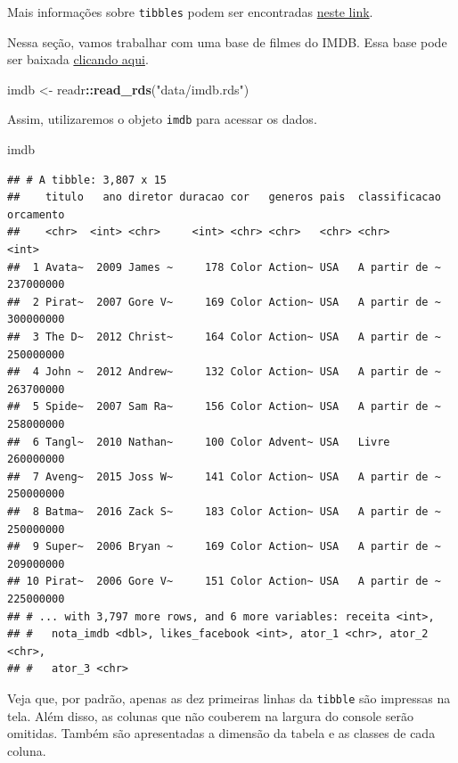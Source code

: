 \documentclass[
]{book}
\newenvironment{Shaded}{\begin{snugshade}}{\end{snugshade}}
\newcommand{\KeywordTok}[1]{\textcolor[rgb]{0.13,0.29,0.53}{\textbf{#1}}}
\newcommand{\NormalTok}[1]{#1}
\newcommand{\OperatorTok}[1]{\textcolor[rgb]{0.81,0.36,0.00}{\textbf{#1}}}
\newcommand{\StringTok}[1]{\textcolor[rgb]{0.31,0.60,0.02}{#1}}
\begin{document}
Mais informações sobre \texttt{tibbles} podem ser encontradas \href{http://r4ds.had.co.nz/tibbles.html}{neste link}.

Nessa seção, vamos trabalhar com uma base de filmes do IMDB. Essa base pode ser baixada \href{https://github.com/curso-r/site-v2/raw/master/content/material/importacao/data/imdb.rds}{clicando aqui}.

\begin{Shaded}
\begin{Highlighting}[]
\NormalTok{imdb <{-}}\StringTok{ }\NormalTok{readr}\OperatorTok{::}\KeywordTok{read\_rds}\NormalTok{(}\StringTok{"data/imdb.rds"}\NormalTok{)}
\end{Highlighting}
\end{Shaded}

Assim, utilizaremos o objeto \texttt{imdb} para acessar os dados.

\begin{Shaded}
\begin{Highlighting}[]
\NormalTok{imdb}
\end{Highlighting}
\end{Shaded}

\begin{verbatim}
## # A tibble: 3,807 x 15
##    titulo   ano diretor duracao cor   generos pais  classificacao orcamento
##    <chr>  <int> <chr>     <int> <chr> <chr>   <chr> <chr>             <int>
##  1 Avata~  2009 James ~     178 Color Action~ USA   A partir de ~ 237000000
##  2 Pirat~  2007 Gore V~     169 Color Action~ USA   A partir de ~ 300000000
##  3 The D~  2012 Christ~     164 Color Action~ USA   A partir de ~ 250000000
##  4 John ~  2012 Andrew~     132 Color Action~ USA   A partir de ~ 263700000
##  5 Spide~  2007 Sam Ra~     156 Color Action~ USA   A partir de ~ 258000000
##  6 Tangl~  2010 Nathan~     100 Color Advent~ USA   Livre         260000000
##  7 Aveng~  2015 Joss W~     141 Color Action~ USA   A partir de ~ 250000000
##  8 Batma~  2016 Zack S~     183 Color Action~ USA   A partir de ~ 250000000
##  9 Super~  2006 Bryan ~     169 Color Action~ USA   A partir de ~ 209000000
## 10 Pirat~  2006 Gore V~     151 Color Action~ USA   A partir de ~ 225000000
## # ... with 3,797 more rows, and 6 more variables: receita <int>,
## #   nota_imdb <dbl>, likes_facebook <int>, ator_1 <chr>, ator_2 <chr>,
## #   ator_3 <chr>
\end{verbatim}

Veja que, por padrão, apenas as dez primeiras linhas da \texttt{tibble} são impressas na tela. Além disso, as colunas que não couberem na largura do console serão omitidas. Também são apresentadas a dimensão da tabela e as classes de cada coluna.
\end{document}
